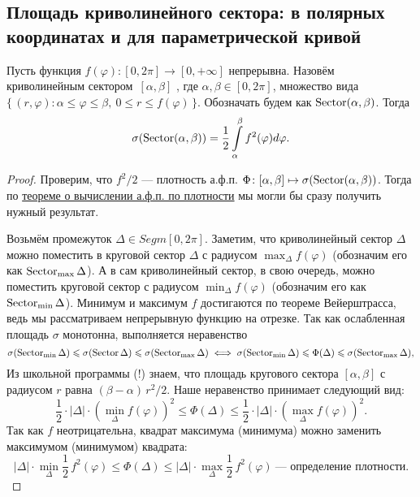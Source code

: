 \subsection{Площадь криволинейного сектора: в полярных координатах и для параметрической кривой}

\begin{theorem}
	Пусть функция \(f(\varphi) \colon [0, 2\pi] \to [0, +\infty]\) непрерывна. Назовём криволинейным сектором~\([\alpha, \beta]\) , где \(\alpha, \beta \in [0, 2\pi]\), множество вида \(\{\, (r, \varphi) : \alpha \leqslant \varphi \leqslant \beta, \ 0 \leqslant r \leqslant f(\varphi) \,\}\). Обозначать будем как \(\operatorname{Sector}(\alpha, \beta)\). Тогда
	\begin{equation} \label{sigma_1}
		\sigma(\operatorname{Sector}(\alpha, \beta)) = \frac{1}{2}\int\limits_\alpha^\beta f^2(\varphi) d\varphi.
	\end{equation}
\end{theorem}

\begin{proof}
	Проверим, что \(f^2 /2\) --- плотность а.ф.п. \(\Phi \colon [\alpha, \beta] \mapsto \sigma(\operatorname{Sector}(\alpha, \beta))\). Тогда по \hyperlink{afp}{теореме о вычислении а.ф.п. по плотности} мы могли бы сразу получить нужный результат.
	
	Возьмём промежуток \(\Delta \in Segm [0, 2\pi]\). Заметим, что криволинейный сектор \(\Delta\) можно поместить в круговой сектор \(\Delta\) с радиусом \(\max_\Delta f(\varphi)\) (обозначим его как \(\operatorname{Sector}_{\max} \Delta\)). А в сам криволинейный сектор, в свою очередь, можно поместить круговой сектор с радиусом \(\min_\Delta f(\varphi)\) (обозначим его как \(\operatorname{Sector}_{\min} \Delta\)). Минимум и максимум \(f\) достигаются по теореме Вейерштрасса, ведь мы рассматриваем непрерывную функцию на отрезке. Так как ослабленная площадь \(\sigma\) монотонна, выполняется неравенство \[
		\sigma(\operatorname{Sector}_{\min} \Delta) \leqslant \sigma(\operatorname{Sector} \Delta) \leqslant \sigma(\operatorname{Sector}_{\max} \Delta) \iff \sigma(\operatorname{Sector}_{\min} \Delta) \leqslant \Phi(\Delta) \leqslant \sigma(\operatorname{Sector}_{\max} \Delta),
	\]
	Из школьной программы (!) знаем, что площадь кругового сектора \([\alpha, \beta]\) с радиусом \(r\) равна \((\beta - \alpha) \, r^2 /2\). Наше неравенство принимает следующий вид: \[
	\frac{1}{2} \cdot |\Delta| \cdot (\min_\Delta f(\varphi))^2 \leqslant \Phi(\Delta) \leqslant \frac{1}{2} \cdot |\Delta| \cdot (\max_\Delta f(\varphi))^2.
	\]
	Так как \(f\) неотрицательна, квадрат максимума (минимума) можно заменить максимумом (минимумом) квадрата: \[
	|\Delta| \cdot \min_\Delta \frac{1}{2} \, f^2(\varphi) \leqslant \Phi(\Delta) \leqslant |\Delta| \cdot \max_\Delta \frac{1}{2} \, f^2(\varphi) \ \text{--- определение плотности.}
	\]
\end{proof}

